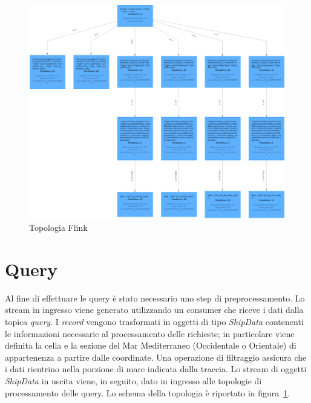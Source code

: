 \documentclass[conference]{IEEEtran}
\begin{document}
\begin{figure}[htbp]
\includegraphics[scale=0.28]{Screenshot/flink_topology.png}
\caption{Topologia Flink}\label{figura:topology}
\end{figure}


\section{\textbf{Query}}
\par Al fine di effettuare le query \`{e} stato necessario uno step di preprocessamento. Lo stream in ingresso viene generato utilizzando un consumer che riceve i dati dalla topica \emph{query}. I \emph{record} vengono trasformati in oggetti di tipo \emph{ShipData} contenenti le informazioni necessarie al processamento delle richieste; in particolare viene definita la cella e la sezione del Mar Mediterraneo (Occidentale o Orientale) di appartenenza a partire dalle coordinate. Una operazione di filtraggio assicura che i dati rientrino nella porzione di mare indicata dalla traccia. Lo stream di oggetti \emph{ShipData} in uscita viene, in seguito, dato in ingresso alle topologie di processamento delle query. Lo schema della topologia \`{e} riportato in figura~\ref{figura:topology}.
\end{document}
